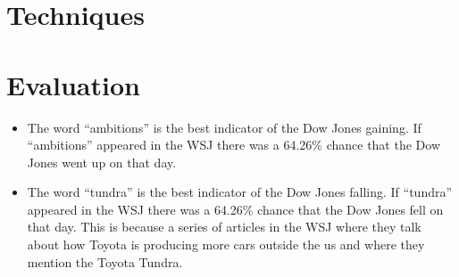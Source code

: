 \documentclass[10pt]{scrartcl}
\begin{document}
\section{Techniques}
\label{sec:techniques}

\section{Evaluation}
\begin{itemize}
\item The word ``ambitions'' is the best indicator of the Dow Jones gaining. If ``ambitions'' appeared in the WSJ there was a 64.26\% chance that the Dow Jones went up on that day.
\item The word ``tundra'' is the best indicator of the Dow Jones falling. If ``tundra'' appeared in the WSJ there was a 64.26\% chance that the Dow Jones fell on that day. This is because a series of articles in the WSJ where they talk about how Toyota is producing more cars outside the us and where they mention the Toyota Tundra.
\end{itemize}



\end{document}
